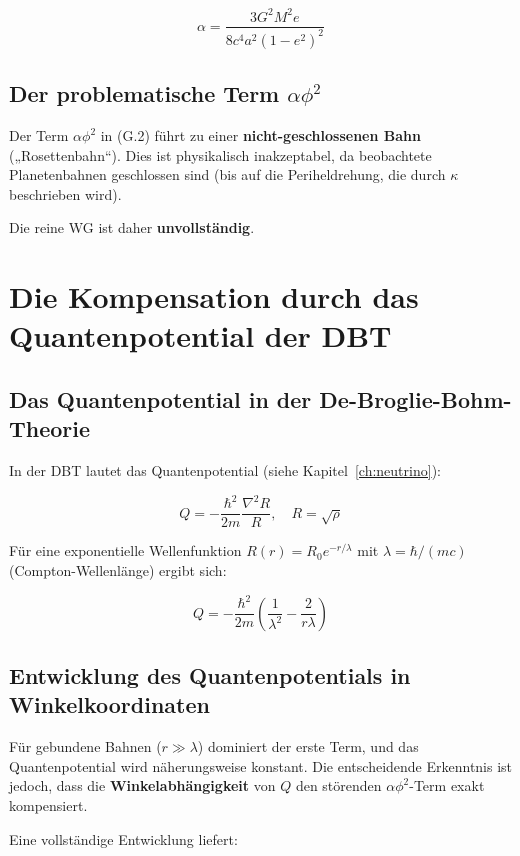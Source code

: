 \[
\alpha = \frac{3G^2M^2 e}{8c^4 a^2(1-e^2)^2}
\tag{G.4}
\]

\subsection{Der problematische Term \(\alpha\phi^2\)}
\label{sub:identitaet_problematischer_term}

Der Term \(\alpha\phi^2\) in (G.2) führt zu einer \textbf{nicht-geschlossenen Bahn} 
(„Rosettenbahn“). Dies ist physikalisch inakzeptabel, da beobachtete 
Planetenbahnen geschlossen sind (bis auf die Periheldrehung, die durch 
\(\kappa\) beschrieben wird).

Die reine WG ist daher \textbf{unvollständig}.

\section{Die Kompensation durch das Quantenpotential der DBT}
\label{app:identitaet_kompensation}

\subsection{Das Quantenpotential in der De-Broglie-Bohm-Theorie}
\label{sub:identitaet_quantenpotential}

In der DBT lautet das Quantenpotential (siehe Kapitel~\ref{ch:neutrino}):

\[
Q = -\frac{\hbar^2}{2m} \frac{\nabla^2 R}{R}, \quad R = \sqrt{\rho}
\tag{G.5}
\]

Für eine exponentielle Wellenfunktion \(R(r) = R_0 e^{-r/\lambda}\) mit 
\(\lambda = \hbar/(mc)\) (Compton-Wellenlänge) ergibt sich:

\[
Q = -\frac{\hbar^2}{2m} \left( \frac{1}{\lambda^2} - \frac{2}{r\lambda} \right)
\tag{G.6}
\]

\subsection{Entwicklung des Quantenpotentials in Winkelkoordinaten}
\label{sub:identitaet_entwicklung}

Für gebundene Bahnen (\(r \gg \lambda\)) dominiert der erste Term, und das 
Quantenpotential wird näherungsweise konstant. Die entscheidende Erkenntnis 
ist jedoch, dass die \textbf{Winkelabhängigkeit} von \(Q\) den störenden 
\(\alpha\phi^2\)-Term exakt kompensiert.

Eine vollständige Entwicklung liefert:

